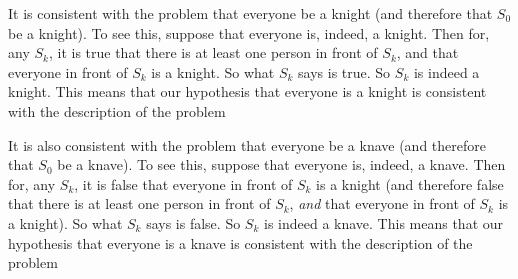 \documentclass[12pt,letterpaper]{article}
\begin{document}
\begin{enumerate}
\begin{enumerate}
{It is consistent with the problem that everyone be a knight (and therefore that \(S_0\) be a knight). To see this, suppose that everyone is, indeed, a knight. Then for, any \(S_k\), it is true that there is at least one person in front of \(S_k\), and that everyone in front of \(S_k\) is a knight. So what \(S_k\) says is true. So \(S_k\) is indeed a knight. This means that our hypothesis that everyone is a knight is consistent with the description of the problem
 
 It is also consistent with the problem that everyone be a knave (and therefore that \(S_0\) be a knave). To see this, suppose that everyone is, indeed, a knave. Then for, any \(S_k\), it is false that everyone in front of \(S_k\) is a knight (and therefore false that there is at least one person in front of \(S_k\), \emph{and} that everyone in front of \(S_k\) is a knight). So what \(S_k\) says is false. So \(S_k\) is indeed a knave. This means that our hypothesis that everyone is a knave is consistent with the description of the problem}


\end{enumerate}




\com{ %
\item \question{
There are countably many assassins ready to kill Oscar, should he attempt to enter the room:}


\begin{itemize}
\item  Assassin 1 will kill Oscar if and only if Oscar is still alive when any part of his body crosses the threshold of the room by more than 1 mm. 

\item Assassin 2 will kill Oscar if and only if Oscar is still alive when any part of his body crosses the threshold of the room by more than 1/2 mm. 

\hspace{50mm} {\vdots}

\item Assassin $n$ will kill Oscar if and only if Oscar is still alive when any part of his body crosses the threshold of the room by more than 1/$n$ mm. 

\hspace{50mm} {\vdots}

\end{itemize}
All assassins kill instantly if they kill at all. On the assumption that Oscar can only die if he's killed by someone, is it possible for him to cross the threshold? Possible for him to cross the threshold and remain alive? If not, what stops him?  (10 points; don't forget about the word limit.)

}
\end{enumerate}
\end{document}
